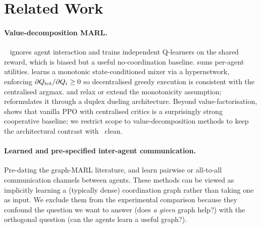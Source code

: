 \section{Related Work}
\label{sec:related}

\paragraph{Value-decomposition MARL.} \iql~\citep{tan_1993_marl} ignores
agent interaction and trains independent Q-learners on the shared reward,
which is biased but a useful no-coordination baseline. \vdn
\citep{sunehag_2018_vdn} sums per-agent utilities. \qmix
\citep{rashid_2018_qmix,rashid_2020_qmix_jmlr} learns a monotonic state-conditioned
mixer via a hypernetwork, enforcing $\partial Q_{\mathrm{tot}} / \partial Q_i \geq 0$
so decentralised greedy execution is consistent with the centralised
argmax.  \citep{son_2019_qtran} and 
\citep{mahajan_2019_maven} relax or extend the monotonicity assumption;
 \citep{wang_2021_qplex} reformulates it through a
duplex dueling architecture. Beyond value-factorisation,
 \citep{yu_2022_mappo} shows that vanilla PPO with
centralised critics is a surprisingly strong cooperative baseline; we
restrict scope to value-decomposition methods to keep the architectural
contrast with \gnnqmix\ clean.

\paragraph{Learned and pre-specified inter-agent communication.}
Pre-dating the graph-MARL literature, 
\citep{foerster_2016_rial_dial} and 
\citep{sukhbaatar_2016_commnet} learn pairwise or all-to-all
communication channels between agents. These methods can be viewed as
implicitly learning a (typically dense) coordination graph rather than
taking one as input. We exclude them from the experimental comparison
because they confound the question we want to answer (does \emph{a given}
graph help?) with the orthogonal question (can the agents learn a useful
graph?).


